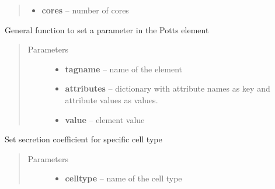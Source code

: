 \documentclass[letterpaper,10pt,english]{sphinxmanual}
\begin{document}
\begin{fulllineitems}
\begin{fulllineitems}
\begin{quote}
\begin{description}
\begin{itemize}
\item {} 
\textbf{cores} -- number of cores

\end{itemize}

\end{description}\end{quote}

\end{fulllineitems}


\begin{fulllineitems}
\label{Experiment:Experiment.Experiment.setPottsProperty}
General function to set a parameter in the Potts element
\begin{quote}\begin{description}
\item[{Parameters}] \leavevmode\begin{itemize}
\item {} 
\textbf{tagname} -- name of the element

\item {} 
\textbf{attributes} -- dictionary with attribute names as key and attribute values as values.

\item {} 
\textbf{value} -- element value

\end{itemize}

\end{description}\end{quote}

\end{fulllineitems}


\begin{fulllineitems}
\label{Experiment:Experiment.Experiment.setSecretion}
Set secretion coefficient for specific cell type
\begin{quote}\begin{description}
\item[{Parameters}] \leavevmode\begin{itemize}
\item {} 
\textbf{celltype} -- name of the cell type


\end{itemize}
\end{description}
\end{quote}
\end{fulllineitems}
\end{fulllineitems}
\end{document}
